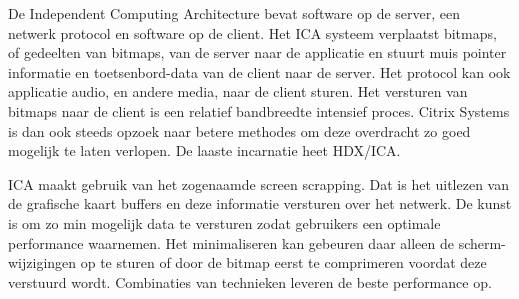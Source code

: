 De Independent Computing Architecture bevat software op de server, een netwerk protocol en software op de client. Het ICA systeem verplaatst bitmaps, of gedeelten van bitmaps, van de server naar de applicatie en stuurt muis pointer informatie en toetsenbord-data van de client naar de server. Het protocol kan ook applicatie audio, en andere media, naar de client sturen. Het versturen van bitmaps naar de client is een relatief bandbreedte intensief proces. Citrix Systems is dan ook steeds opzoek naar betere methodes om deze overdracht zo goed mogelijk te laten verlopen. De laaste incarnatie heet HDX/ICA.

ICA maakt gebruik van het zogenaamde screen scrapping. Dat is het uitlezen van de grafische kaart buffers en deze informatie versturen over het netwerk. De kunst is om zo min mogelijk data te versturen zodat gebruikers een optimale performance waarnemen. Het minimaliseren kan gebeuren daar alleen de scherm-wijzigingen op te sturen of door de bitmap eerst te comprimeren voordat deze verstuurd wordt. Combinaties van technieken leveren de beste performance op.
